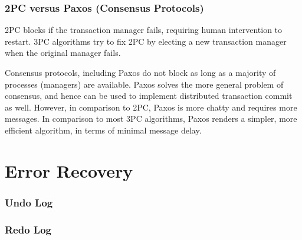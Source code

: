 \documentclass[12]{beamer}
\begin{document}
\begin{frame}
\frametitle{2PC versus Paxos (Consensus Protocols)}
2PC blocks if the transaction manager fails, requiring human intervention to restart. 3PC algorithms try to fix 2PC by electing a new transaction manager when the original manager fails.
\vspace{10pt}

Consensus protocols, including Paxos do not block as long as a majority of processes (managers) are available. Paxos solves the more general problem of consensus, and hence can be used to implement distributed transaction commit as well. However, in comparison to 2PC, Paxos is more chatty and requires more messages. In comparison to most 3PC algorithms, Paxos renders a simpler, more efficient algorithm, in terms of minimal message delay.
\end{frame}

\section{Error Recovery}

\begin{frame}
  \frametitle{Undo Log}
\end{frame}

\begin{frame}
  \frametitle{Redo Log}
\end{frame}
\end{document}

